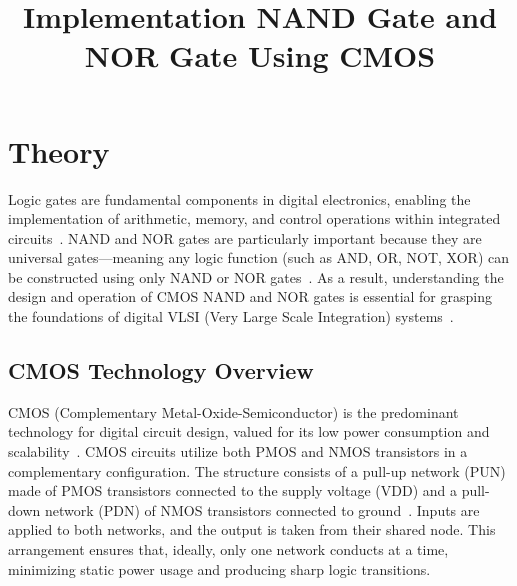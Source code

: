 \documentclass[12pt]{article}
\title{Implementation NAND Gate and NOR Gate Using CMOS}
\author{}
\date{}
\begin{document}


\pagebreak

\tableofcontents

\pagebreak
{}
\maketitle

\section*{Theory}
Logic gates are fundamental components in digital electronics, enabling the implementation of arithmetic, memory, and control operations within integrated circuits~\cite{weste2015cmos}. NAND and NOR gates are particularly important because they are universal gates—meaning any logic function (such as AND, OR, NOT, XOR) can be constructed using only NAND or NOR gates~\cite{manohar2017digital}. As a result, understanding the design and operation of CMOS NAND and NOR gates is essential for grasping the foundations of digital VLSI (Very Large Scale Integration) systems~\cite{kang2019cmos}.

\subsection*{CMOS Technology Overview}
CMOS (Complementary Metal-Oxide-Semiconductor) is the predominant technology for digital circuit design, valued for its low power consumption and scalability~\cite{weste2015cmos}. CMOS circuits utilize both PMOS and NMOS transistors in a complementary configuration. The structure consists of a pull-up network (PUN) made of PMOS transistors connected to the supply voltage (VDD) and a pull-down network (PDN) of NMOS transistors connected to ground~\cite{kang2019cmos}. Inputs are applied to both networks, and the output is taken from their shared node. This arrangement ensures that, ideally, only one network conducts at a time, minimizing static power usage and producing sharp logic transitions.
\end{document}
